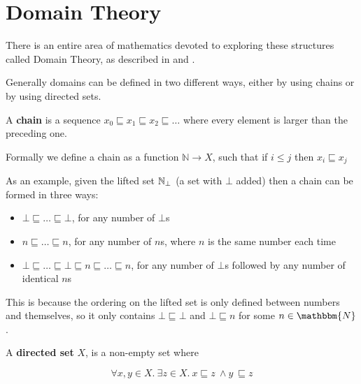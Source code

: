 \section{Domain Theory}\label{dom}
There is an entire area of mathematics devoted to exploring these structures called Domain Theory, as described in \citep{Gunter92} and  \citep{Hutton14}.

Generally domains can be defined in two different ways, either by using chains or by using directed sets.

\vspace{0.5cm}

\begin{defn}
A \textbf{chain} is a sequence $x_0 \sqsubseteq x_1 \sqsubseteq x_2 \sqsubseteq \dots $ where every element is larger than the preceding one.

\vspace{0.5cm}

Formally we define a chain as a function $\mathbb{N} \to X$, such that if $i \leq j$ then $x_i \sqsubseteq x_j$
\end{defn}

As an example, given the lifted set  $\mathbb{N}_{\bot}$ (a set with $\bot$ added) then a chain can be formed in three ways:

\begin{itemize}
\item{$\bot \sqsubseteq \dots \sqsubseteq \bot$, for any number of $\bot$s}
\item{$n \sqsubseteq \dots \sqsubseteq n$, for any number of $n$s, where $n$ is the same number each time}
\item{$\bot \sqsubseteq \dots \sqsubseteq \bot \sqsubseteq n \sqsubseteq \dots \sqsubseteq n$, for any number of $\bot$s followed by any number of identical $n$s}
\end{itemize}

This is because the ordering on the lifted set is only defined between numbers and themselves, so it only contains $\bot \sqsubseteq \bot$ and $\bot \sqsubseteq n$ for some $n \in \mathbbm{N}$.

\vspace{0.5cm}
 
\begin{defn}
A \textbf{directed set} $X$, is a non-empty set where

\[ \forall x,y \in X. \ \exists z \in X. \ x \sqsubseteq z \ \wedge y \ \sqsubseteq z \]
\end{defn}

